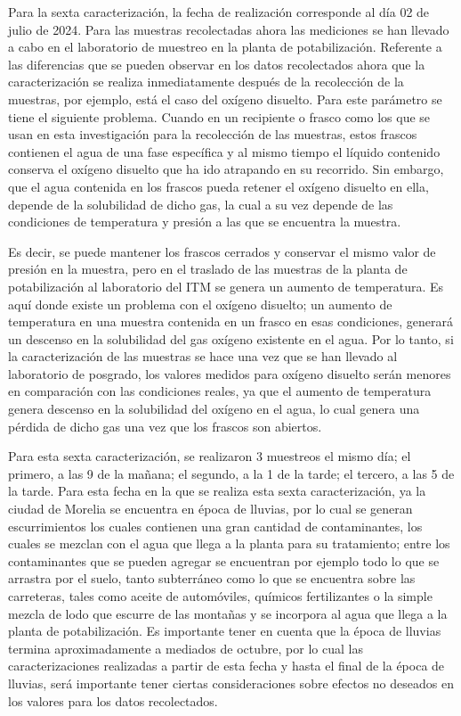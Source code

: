 Para la sexta caracterización, la fecha de realización corresponde al día 02 de julio de 2024. Para las muestras recolectadas ahora las mediciones se han llevado a cabo en el laboratorio de muestreo 
en la planta de potabilización. Referente a las diferencias que se pueden observar en los datos recolectados ahora que la caracterización
se realiza inmediatamente después de la recolección de la muestras, por ejemplo, está el caso del oxígeno disuelto. Para este parámetro se tiene el siguiente problema. Cuando en un recipiente o frasco como los que se usan 
en esta investigación para la recolección de las muestras, estos frascos contienen el agua de una fase específica y al mismo tiempo el líquido contenido conserva el oxígeno disuelto 
que ha ido atrapando en su recorrido. Sin embargo, que el agua contenida en los frascos pueda retener el oxígeno disuelto en ella, depende de la solubilidad de dicho gas, la cual a su vez depende de las condiciones de temperatura 
y presión a las que se encuentra la muestra. 

Es decir, se puede mantener los frascos cerrados y conservar el mismo valor de presión en la muestra, pero en el traslado de las muestras de la planta de potabilización al laboratorio 
del ITM se genera un aumento de temperatura. Es aquí donde existe un problema con el oxígeno disuelto; un aumento de temperatura en una muestra contenida en un 
frasco en esas condiciones, generará un descenso en la solubilidad del gas oxígeno existente en el agua.
Por lo tanto, si la caracterización de las muestras se hace una vez que se han llevado al laboratorio de posgrado, los valores medidos para oxígeno disuelto serán menores en comparación con las condiciones reales, ya que 
el aumento de temperatura genera descenso en la solubilidad del oxígeno en el agua, lo cual genera una pérdida de dicho gas una vez que los frascos son abiertos. 

Para esta sexta caracterización, se realizaron 3 muestreos el mismo día; el primero, a las 9 de la mañana; el segundo, a la 1 de la tarde; el tercero, a las 5 de la tarde. Para esta fecha en la que se realiza esta sexta 
caracterización, ya la ciudad de Morelia se encuentra en época de lluvias, por lo cual se generan escurrimientos los cuales contienen una gran cantidad de contaminantes, los cuales se mezclan con el agua que llega a la planta
para su tratamiento; entre los contaminantes que se pueden agregar se encuentran por ejemplo todo lo que se arrastra por el suelo, tanto subterráneo como lo que se encuentra sobre las carreteras, tales como aceite de automóviles,
químicos fertilizantes o la simple mezcla de lodo que escurre de las montañas y se incorpora al agua que llega a la planta de potabilización. Es importante tener en cuenta que la época de lluvias termina aproximadamente a 
mediados de octubre, por lo cual las caracterizaciones realizadas a partir de esta fecha y hasta el final de la época de lluvias, será importante tener ciertas consideraciones sobre efectos no deseados en los valores para 
los datos recolectados. 

